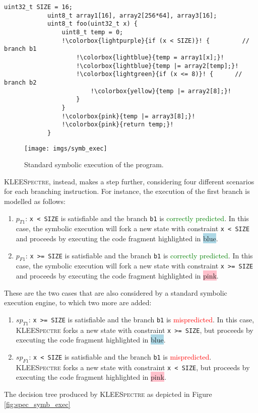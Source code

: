 \documentclass[target=mst,aauheader=aics]{thud}
\theoremstyle{definition}
\begin{document}
	\begin{minipage}{.7\textwidth}
		\begin{lstlisting}[escapechar=!, label=spec_symb_exec_example]
			uint32_t SIZE = 16; 
			uint8_t array1[16], array2[256*64], array3[16];
			uint8_t foo(uint32_t x) { 
				uint8_t temp = 0; 
				!\colorbox{lightpurple}{if (x < SIZE)}! {		  // branch b1
					!\colorbox{lightblue}{temp = array1[x];}!
					!\colorbox{lightblue}{temp |= array2[temp];}!
					!\colorbox{lightgreen}{if (x <= 8)}! {		// branch b2
						!\colorbox{yellow}{temp |= array2[8];}!
					}	
				}
				!\colorbox{pink}{temp |= array3[8];}!
				!\colorbox{pink}{return temp;}!
			}
		\end{lstlisting}
	\end{minipage}
	
	\begin{figure}[!h]
		\centering
		\texttt{[image: imgs/symb\_exec]}
		\caption{Standard symbolic execution of the program.}
		\label{fig:standars_symb_exec}
	\end{figure}
	
	\textsc{KLEESpectre}, instead, makes a step further, considering four different scenarios for each branching instruction. For instance, the execution of the first branch is modelled as follows: 
	\begin{enumerate}
		\item $p_{T1}$: \texttt{x < SIZE} is satisfiable and the branch \texttt{b1} is \textcolor{green}{correctly predicted}. In this case, the symbolic execution will fork a new state with constraint \texttt{x < SIZE} and proceeds by executing the code fragment highlighted in \colorbox{lightblue}{blue}.
		\item $p_{F1}$: \texttt{x >= SIZE} is satisfiable and the branch \texttt{b1} is \textcolor{green}{correctly predicted}. In this case, the symbolic execution will fork a new state with constraint \texttt{x >= SIZE} and proceeds by executing the code fragment highlighted in \colorbox{pink}{pink}.
	\end{enumerate}
	These are the two cases that are also considered by a standard symbolic execution engine, to which two more are added:
	\begin{enumerate}[resume]
		\item $sp_{T1}$: \texttt{x >= SIZE} is satisfiable and the branch \texttt{b1} is \textcolor{red}{mispredicted}. In this case, \textsc{KLEESpectre} forks a new state with constraint \texttt{x >= SIZE}, but proceeds by executing the code fragment highlighted in \colorbox{lightblue}{blue}.
		\item $sp_{F1}$: \texttt{x < SIZE} is satisfiable and the branch \texttt{b1} is \textcolor{red}{mispredicted}. \textsc{KLEESpectre} forks a new state with constraint \texttt{x < SIZE}, but proceeds by executing the code fragment highlighted in \colorbox{pink}{pink}.
	\end{enumerate}
	The decision tree produced by \textsc{KLEESpectre} as depicted in Figure \ref{fig:spec_symb_exec}
	
\end{document}
